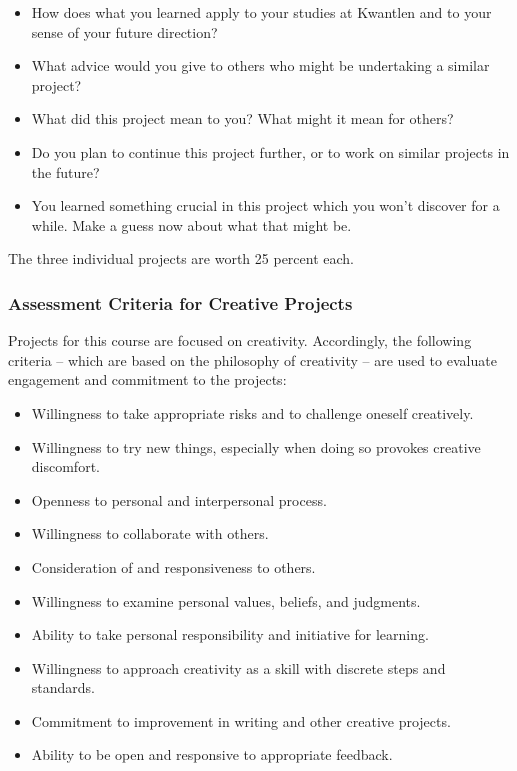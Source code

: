 \documentclass[letterpaper,10pt,headsepline]{scrreprt}
\begin{document}
\begin{itemize}
\item How does what you learned apply to your studies at Kwantlen and to your sense of your future direction?

\item What advice would you give to others who might be undertaking a similar project?

\item What did this project mean to you? What might it mean for others?

\item Do you plan to continue this project further, or to work on similar projects in the future?

\item You learned something crucial in this project which you won't discover for a while. Make a guess now about what that might be.

\end{itemize}

The three individual projects are worth 25 percent each.

\subsubsection{Assessment Criteria for Creative Projects}

Projects for this course are focused on creativity. Accordingly, the following criteria -- which are based on the philosophy of creativity  --  are used to evaluate engagement and commitment to the projects:

\begin{itemize}
\item Willingness to take appropriate risks and to challenge oneself creatively.
\item Willingness to try new things, especially when doing so provokes creative discomfort.
\item Openness to personal and interpersonal process.
\item Willingness to collaborate with others.
\item Consideration of and responsiveness to others.
\item Willingness to examine personal values, beliefs, and judgments.
\item Ability to take personal responsibility and initiative for learning.
\item Willingness to approach creativity as a skill with discrete steps and standards.
\item Commitment to improvement in writing and other creative projects.
\item Ability to be open and responsive to appropriate feedback.
\end{itemize}
\end{document}
